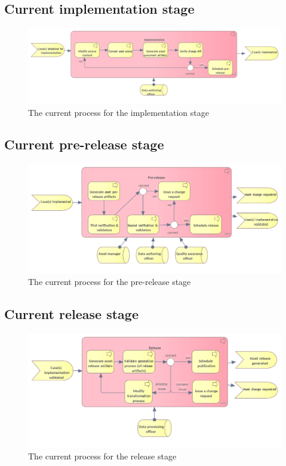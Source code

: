 	
	
	\subsection{Current implementation stage}
	\label{sec:implementation-current}
	
	\begin{figure}[h]
		\centering
		\includegraphics[width=.9\textwidth]{images/business/current/Implementation.png}
		\caption{The current process for the implementation stage}
		\label{fig:implementation-current}
	\end{figure}
	
	
	\subsection{Current pre-release stage}
	\label{sec:pre-release-current}	

	\begin{figure}[h]
		\centering
		\includegraphics[width=.9\textwidth]{images/business/current/Pre-release.png}
		\caption{The current process for the pre-release stage}
		\label{fig:pre-release-current}
	\end{figure}

	\subsection{Current release stage}
	\label{sec:release-current}

	\begin{figure}[h]
		\centering
		\includegraphics[width=.9\textwidth]{images/business/current/Release.png}
		\caption{The current process for the release stage}
		\label{fig:release-current}
	\end{figure}

